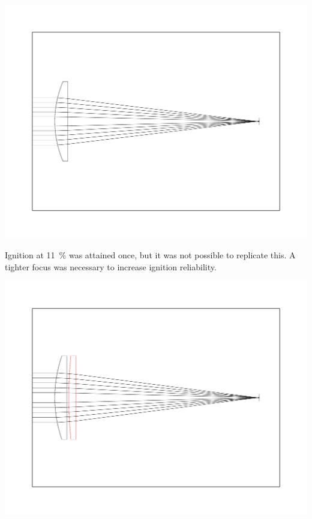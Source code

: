         \includegraphics[width=\textwidth]{assets/5 results/125lens.pdf}
        
        Ignition at \qty{11}{\%} was attained once, but it was not possible to replicate this. A tighter focus was necessary to increase ignition reliability.


        \includegraphics[width=\textwidth]{assets/5 results/500 and 150 lenses.pdf}


